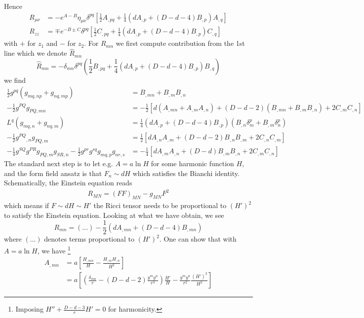 Hence
\begin{align}
R_{\mu\nu}
&=-e^{A-B}\eta_{\mu\nu}\delta^{pq}\left[\frac{1}{2}A_{,pq} + \frac{1}{4}(dA_{,p}+(D-d-4)B_{,p})A_{,q}\right]\\
R_{zz}
&=\mp e^{-B\pm C}\delta^{pq}
\left[
    \frac{1}{2}C_{,pq}+\frac{1}{4}(dA_{,p}+(D-d-4)B_{,p})C_{,q}
\right]
\end{align}
with $+$ for $z_1$ and $-$ for $z_2$.
For $R_{mn}$ we first compute contribution from the 1st line which we denote $\hat{R}_{mn}$
\begin{equation}
\hat{R}_{mn} =
-\delta_{mn}\delta^{pq}(\frac{1}{2}B_{,pq}+\frac{1}{4}(dA_{,p}+(D-d-4)B_{,p})B_{,q})
\end{equation}
we find
\begin{align}
\frac{1}{2}g^{pq}(g_{mq,np}+g_{nq,mp})
&=B_{,mn}+B_{,m}B_{,n}\\
-\frac{1}{2}g^{PQ}g_{PQ,mn}
&=-\frac{1}{2}[d(A_{,mn}+A_{,m}A_{,n})+(D-d-2)(B_{,mn}+B_{,m}B_{,n}) + 2C_{,m}C_{,n}]\\
L^q(g_{mq,n}+g_{nq,m})&=\frac{1}{4}(dA_{,p}+(D-d-4)B_{,p})(B_{,n}\delta^p_m+B_{,m}\delta^p_n)\\
-\frac{1}{2}g^{PQ}{}_{,n}g_{PQ,m}
&=\frac{1}{2}[dA_{,n}A_{,m}+(D-d-2)B_{,n}B_{,m}+2C_{,n}C_{,m}]\\
-\frac{1}{4}g^{SQ}g^{PR}g_{PQ,m}g_{SR,n}-\frac{1}{2}g^{pr}g^{sq}g_{mq,p}g_{nr,s}
&=-\frac{1}{4}\left[dA_{,m}A_{,n}+(D-d)B_{,m}B_{,n}+2C_{,m}C_{,n}\right]
\end{align}
The standard next step is to let e.g. $A = a\ln H$ for some harmonic function $H$, and the form field ansatz is that $F_n \sim dH$ which satisfies the Bianchi identity.
Schematically, the Einstein equation reads
\begin{eqnarray}
R_{MN} = (FF)_{MN} - g_{MN}F^2
\end{eqnarray}
which means if $F \sim dH \sim H'$ the Ricci tensor needs to be proportional to $(H')^2$ to satisfy the Einstein equation.
Looking at what we have obtain, we see
\begin{equation}
R_{mn} = (...) -\frac{1}{2}(d A_{,mn} + (D-d-4)B_{,mn})
\end{equation}
where $(...)$ denotes terms proportional to $(H')^2$.
One can show that with $A = a\ln H$, we have 
\footnote{Imposing $H'' + \frac{D-d-3}{r}H' = 0$ for harmonicity.}
\begin{align}
A_{,mn} 
&= a\left[
    \frac{H_{,mn}}{H} - \frac{H_{,m}H_{,n}}{H^2}
\right]\\
&= a\left[
    \left(\frac{\delta_{mn}}{r} - (D-d-2)\frac{y^my^n}{r^3}\right)\frac{H'}{H}
    -\frac{y^my^n}{r^2}\frac{(H')^2}{H^2}
\right]
\end{align}
